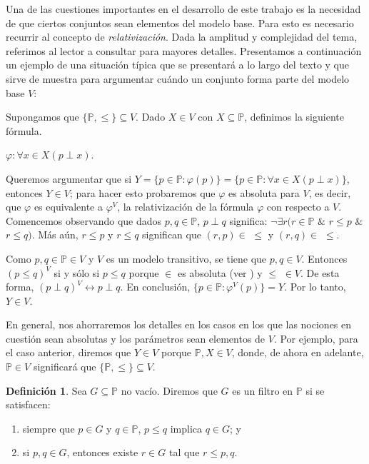 \documentclass[11pt]{unam_tesis1}
\theoremstyle{MyThmStyle}
\theoremstyle{definition}
\newtheorem{definition}{Definici\'on}[chapter]
\theoremstyle{plain}
\theoremstyle{remark}
\let\leq\leqslant
\begin{document}
Una de las cuestiones importantes en el desarrollo de este trabajo es la necesidad de que ciertos conjuntos sean elementos del modelo base. Para esto es necesario recurrir al concepto de {\sl relativizaci\'on}. Dada la amplitud y complejidad del tema, referimos al lector a consultar \cite[IV \S 2]{kunen} para mayores detalles. Presentamos a continuaci\'on un ejemplo de una situaci\'on t\'ipica que se presentar\'a a lo largo del texto y que sirve de muestra para argumentar cu\'ando un conjunto forma parte del modelo base $V$:

Supongamos que $\{ \mathbb P,\leq \} \subseteq V$. Dado $X \in V$ con $X \subseteq \mathbb P$, definimos la siguiente f\'ormula.
\begin{center}
$\varphi:\forall x \in X (p \perp x)$.
\end{center}
Queremos argumentar que si $Y = \{ p\in \mathbb P:\varphi(p) \} = \{p\in \mathbb P: \forall x\in X(p\perp x)\}$, entonces $Y\in V$; para hacer esto probaremos que $\varphi$ es absoluta para $V$, es decir, que $\varphi$ es equivalente a $\varphi^V$, la relativizaci\'on de la f\'ormula $\varphi$ con respecto a $V$. Comencemos observando que dados $p,q\in \mathbb P$, $p\perp q$ significa: $\neg \exists r(r\in \mathbb P$ $\&$ $r\leq p$ $\&$ $r\leq q)$. M\'as a\'un, $r\leq p$ y $r\leq q$ significan que $(r,p)\in$ $\leq$ y $(r,q)\in$ $\leq$.

Como $p,q\in \mathbb P\in V$ y $V$ es un modelo transitivo, se tiene que $p,q\in V$. Entonces $(p\leq q)^V$ si y s\'olo si $p\leq q$ porque $\in$ es absoluta (ver \cite[VI \S 3]{kunen}) y $\leq$ $\in V$. De esta forma, $(p\perp q)^V\leftrightarrow p\perp q$. En conclusi\'on, $\{p\in \mathbb P: \varphi^V(p)\}=Y$. Por lo tanto, $Y\in V$.

En general, nos ahorraremos los detalles en los casos en los que las nociones en cuesti\'on sean absolutas y los par\'ametros sean elementos de $V$. Por ejemplo, para el caso anterior, diremos que $Y\in V$ porque $\mathbb P,X\in V$, donde, de ahora en adelante, $\mathbb P \in V$ significar\'a que $\{\mathbb P,\leq \}\subseteq V$.

\begin{definition}
Sea $G\subseteq \mathbb P$ no vac\'io. Diremos que $G$ es un filtro en $\mathbb P$ si se satisfacen:

\begin{enumerate}
\item siempre que $p\in G$ y $q\in \mathbb P$, $p\leq q$ implica $q\in G$; y
\item si $p,q \in G$, entonces existe $r\in G$ tal que $r\leq p,q$.
\end{enumerate}

\end{definition}
\end{document}
